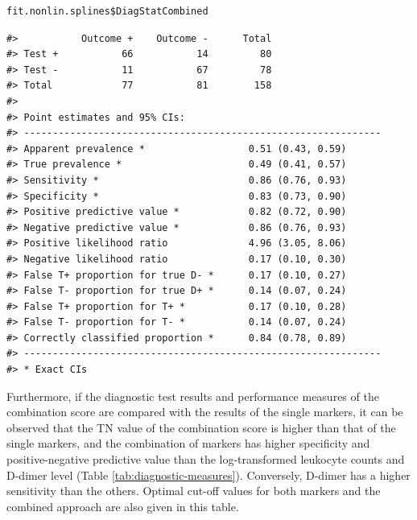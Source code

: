 \begin{verbatim}
fit.nonlin.splines$DiagStatCombined
\end{verbatim}

\begin{verbatim}
#>           Outcome +    Outcome -      Total
#> Test +           66           14         80
#> Test -           11           67         78
#> Total            77           81        158
#> 
#> Point estimates and 95% CIs:
#> --------------------------------------------------------------
#> Apparent prevalence *                  0.51 (0.43, 0.59)
#> True prevalence *                      0.49 (0.41, 0.57)
#> Sensitivity *                          0.86 (0.76, 0.93)
#> Specificity *                          0.83 (0.73, 0.90)
#> Positive predictive value *            0.82 (0.72, 0.90)
#> Negative predictive value *            0.86 (0.76, 0.93)
#> Positive likelihood ratio              4.96 (3.05, 8.06)
#> Negative likelihood ratio              0.17 (0.10, 0.30)
#> False T+ proportion for true D- *      0.17 (0.10, 0.27)
#> False T- proportion for true D+ *      0.14 (0.07, 0.24)
#> False T+ proportion for T+ *           0.17 (0.10, 0.28)
#> False T- proportion for T- *           0.14 (0.07, 0.24)
#> Correctly classified proportion *      0.84 (0.78, 0.89)
#> --------------------------------------------------------------
#> * Exact CIs
\end{verbatim}

Furthermore, if the diagnostic test results and performance measures of the combination score are compared with the results of the single markers, it can be observed that the TN value of the combination score is higher than that of the single markers, and the combination of markers has higher specificity and positive-negative predictive value than the log-transformed leukocyte counts and D-dimer level (Table \ref{tab:diagnostic-measures}). Conversely, D-dimer has a higher sensitivity than the others. Optimal cut-off values for both markers and the combined approach are also given in this table.

